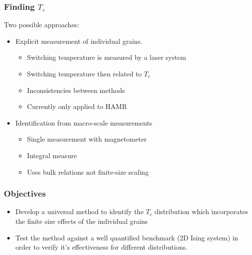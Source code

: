 \documentclass{beamer}
\begin{document}
\begin{frame}
	\frametitle{Finding $T_c$}
	Two possible approaches:
	\vspace{4mm}
	\begin{itemize}
		\item{Explicit measurement of individual grains.\footnotemark[3]}
		\begin{itemize}
			\item{Switching temperature is measured by a laser system}
			\item{Switching temperature then related to $T_c$}
			\item{Inconsistencies between methods}
			\item{Currently only applied to HAMR}
		\end{itemize}
		\vspace{4mm}
		\item{Identification from macro-scale measurements\footnotemark[4]}
		\begin{itemize}
			\item{Single measurement with magnetometer}
			\item{Integral measure}
			\item{Uses bulk relations not finite-size scaling}
		\end{itemize}
	\end{itemize}
\end{frame}

\begin{frame}
	\frametitle{Objectives}
	\begin{itemize}
		\item{Develop a universal method to identify the $T_c$ distribution which incorporates the finite size effects of the individual grains\newline}
		\item{Test the method against a well quantified benchmark (2D Ising system) in order to verify it's effectiveness for different distributions.\newline}
	\end{itemize}
\end{frame}
\end{document}
